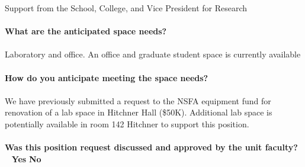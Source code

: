 \documentclass[11pt]{article}
\begin{document}
Support from the School, College, and Vice President for Research\\~\\
\vfill
\noindent\textbf{\rmfamily What are the anticipated space needs?}\\~\\ Laboratory and office. An office and graduate student space is currently available\\~\\
\vfill
\noindent\textbf{\rmfamily How do you anticipate meeting the space needs?} \\~\\
We have previously submitted a request to the NSFA equipment fund for renovation of a lab space in Hitchner Hall (\$50K). Additional lab space is potentially available in room 142 Hitchner to support this position.\\~\\
\vfill
\noindent\textbf{\rmfamily Was this position request discussed and approved by the unit faculty?} \hfill ~ \hfill \textbf{\Large{\HollowBox} \normalsize{Yes}} \hfill \textbf{\Large{\HollowBox} \normalsize{ No}}\\~\\%
\end{document}
